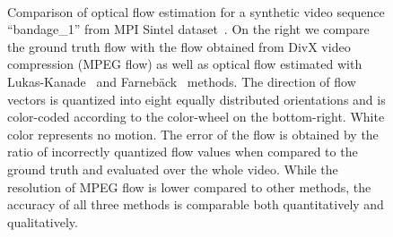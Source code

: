 \documentclass[10pt,twocolumn,letterpaper]{article}
\begin{document}
\begin{figure}[t!]
\begin{center}
\begin{tabular}{p{}p{}p{}}
\end{tabular}
\caption{Comparison of optical flow estimation for a synthetic video sequence ``bandage\_1'' from MPI Sintel dataset~\cite{Butler12}. On the right we compare the ground truth flow with the flow obtained from DivX video compression (MPEG flow) as well as optical flow estimated with Lukas-Kanade~\cite{Lucas81} and Farneb\"ack~\cite{Farneback03} methods. The direction of flow vectors is quantized into eight equally distributed orientations and is color-coded according to the color-wheel on the bottom-right. White color represents no motion. The error of the flow is obtained by the ratio of incorrectly quantized flow values when compared to the ground truth and evaluated over the whole video. While the resolution of MPEG flow is lower compared to other methods, the accuracy of all three methods is comparable both quantitatively and qualitatively.
}
\mbox{}\vspace{-.6cm}\\
\label{fig:flow1}
\end{center}
\end{figure}
\end{document}
